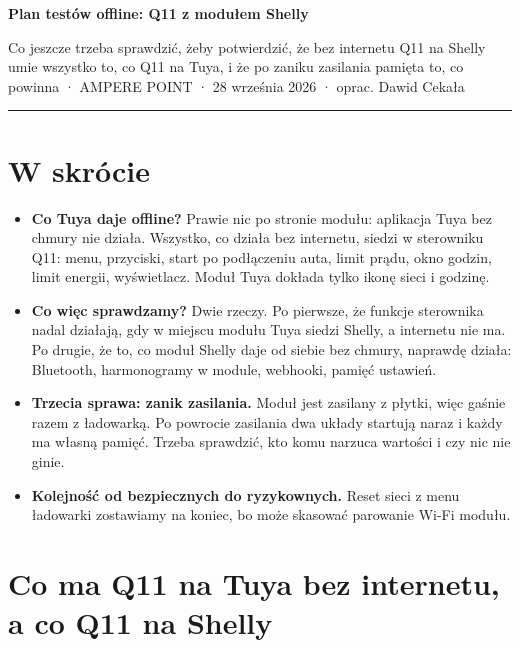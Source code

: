 \documentclass[11pt,a4paper]{article}
\begin{document}
{\LARGE\bfseries Plan testów offline: Q11 z modułem Shelly\par}
{\large Co jeszcze trzeba sprawdzić, żeby potwierdzić, że bez internetu Q11 na Shelly umie wszystko to, co Q11 na Tuya, i że po zaniku zasilania pamięta to, co powinna · AMPERE POINT · 28 września 2026 · oprac. Dawid Cekała\par}
\vspace{4pt}\textcolor{apteal}{\rule{\textwidth}{1.2pt}}

\section*{W skrócie}

\begin{itemize}
\item \textbf{Co Tuya daje offline?} Prawie nic po stronie modułu: aplikacja Tuya bez chmury nie działa. Wszystko, co działa bez internetu, siedzi w sterowniku Q11: menu, przyciski, start po podłączeniu auta, limit prądu, okno godzin, limit energii, wyświetlacz. Moduł Tuya dokłada tylko ikonę sieci i godzinę.
\item \textbf{Co więc sprawdzamy?} Dwie rzeczy. Po pierwsze, że funkcje sterownika nadal działają, gdy w miejscu modułu Tuya siedzi Shelly, a internetu nie ma. Po drugie, że to, co moduł Shelly daje od siebie bez chmury, naprawdę działa: Bluetooth, harmonogramy w module, webhooki, pamięć ustawień.
\item \textbf{Trzecia sprawa: zanik zasilania.} Moduł jest zasilany z płytki, więc gaśnie razem z ładowarką. Po powrocie zasilania dwa układy startują naraz i każdy ma własną pamięć. Trzeba sprawdzić, kto komu narzuca wartości i czy nic nie ginie.
\item \textbf{Kolejność od bezpiecznych do ryzykownych.} Reset sieci z menu ładowarki zostawiamy na koniec, bo może skasować parowanie Wi-Fi modułu.
\end{itemize}

\section{Co ma Q11 na Tuya bez internetu, a co Q11 na Shelly}
\end{document}
